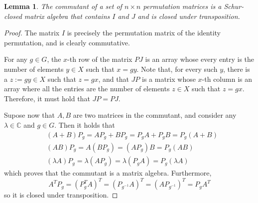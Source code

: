 \documentclass[a4paper,12pt]{article}
\theoremstyle{plain}
\newtheorem{lemma}[theorem]{Lemma}
\theoremstyle{definition}
\theoremstyle{remark}
\begin{document}
\begin{lemma}
    The commutant of a set of $ n \times n $ permutation matrices is a Schur-closed
    matrix algebra that contains $ I $ and $ J $ and is closed under transposition.
\end{lemma}
\begin{proof}
    The matrix $ I $ is precisely the permutation matrix of the identity permutation,
    and is clearly commutative.

    For any $ g \in G $, the $ x $-th row of the matrix $ PJ $ is an array whose
    every entry is the number of elements $ y \in X $ such that $ x = gy $. Note
    that, for every such $ y $, there is a $ z := gy \in X $ such that
    $ z = gx $, and that $ JP $ is a matrix whose $ x $-th column is an array
    where all the entries are the number of elements $ z \in X $ such that
    $ z = gx $. Therefore, it must hold that $ JP = PJ $.

    Supose now that $ A,B $ are two matrices in the commutant, and consider any
    $ \lambda \in \mathbb{C} $ and $ g \in G $. Then it holds that
    \begin{equation*}
        \begin{split}
            & (A+B) P_g = AP_g + BP_g = P_gA + P_gB = P_g(A+B) \\
            &(AB) P_g = A(BP_g) = (AP_g)B = P_g(AB) \\
            &(\lambda A)P_g = \lambda(AP_g) = \lambda (P_gA) = P_g(\lambda A)
        \end{split}
    \end{equation*}
    which proves that the commutant is a matrix algebra. Furthermore,
    \[ A^TP_g = (P_g^TA)^T = (P_{g^{-1}}A)^T = (AP_{g^{-1}})^T = P_g A^T \]
    so it is closed under transposition.


\end{proof}
\end{document}
